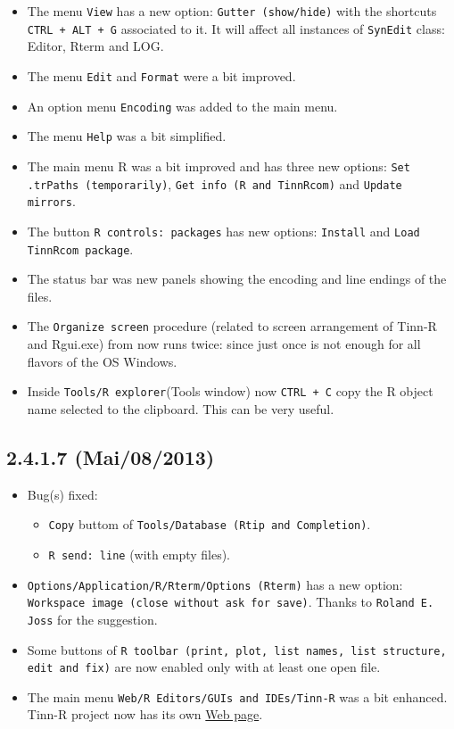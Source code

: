\begin{itemize}
  \item The menu \texttt{View} has a new option: \texttt{Gutter (show/hide)} with the shortcuts
   \texttt{CTRL + ALT + G} associated to it. It will affect all instances of \texttt{SynEdit} class:
   Editor, Rterm and LOG.
  \item The menu \texttt{Edit} and \texttt{Format} were a bit improved.
  \item An option menu \texttt{Encoding} was added to the main menu.
  \item The menu \texttt{Help} was a bit simplified.
  \item The main menu R was a bit improved and has three new options:
   \texttt{Set .trPaths (temporarily)}, \texttt{Get info (R and TinnRcom)} and \texttt{Update mirrors}.
  \item The button \texttt{R controls: packages} has new options: \texttt{Install} and
  \texttt{Load TinnRcom package}.
  \item The status bar was new panels showing the encoding and line endings of the files.
  \item The \texttt{Organize screen} procedure (related to screen arrangement of Tinn-R and Rgui.exe)
   from now runs twice: since just once is not enough for all flavors of the OS Windows.
  \item Inside \texttt{Tools/R explorer}(Tools window) now \texttt{CTRL + C} copy
   the R object name selected to the clipboard.
   This can be very useful.
\end{itemize}


\subsection*{2.4.1.7 (Mai/08/2013)}
\begin{itemize}
  \item Bug(s) fixed:
    \begin{itemize}
      \item \texttt{Copy} buttom of \texttt{Tools/Database (Rtip and Completion)}.
      \item \texttt{R send: line} (with empty files).
    \end{itemize}
  \item \texttt{Options/Application/R/Rterm/Options (Rterm)} has a new option:
   \texttt{Workspace image (close without ask for save)}.
   Thanks to \texttt{Roland E. Joss} for the suggestion.
  \item Some buttons of \texttt{R toolbar (print, plot, list names, list structure, edit and fix)}
   are now enabled only with at least one open file.
  \item The main menu \texttt{Web/R Editors/GUIs and IDEs/Tinn-R} was a bit enhanced.
   Tinn-R project now has its own \href{https://tinn-r.org/en/}{Web page}.
\end{itemize}


